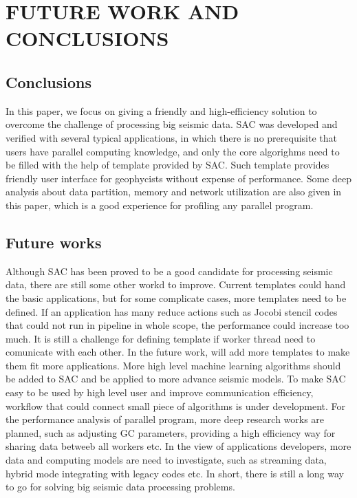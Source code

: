 %
%
%



\chapter{\uppercase{Future Work and Conclusions}}

\section{Conclusions}

In this paper, we focus on giving a friendly and high-efficiency solution to overcome the challenge of processing big seismic data. SAC was developed and verified with several typical applications, in which there is no prerequisite that users have parallel computing knowledge, and only the core algorighms need to be filled with the help of template provided by SAC. Such template provides friendly user interface for geophycists without expense of performance. Some deep analysis about data partition, memory and network utilization are also given in this paper, which is a good experience for profiling any parallel program. 

\section{Future works}

Although SAC has been proved to be a good candidate for processing seismic data, there are still some other workd to improve. Current templates could hand the basic applications, but for some complicate cases, more templates need to be defined. If an application has many reduce actions such as Jocobi stencil codes that could not run in pipeline in whole scope, the performance could increase too much. It is still a challenge for defining template if worker thread need to comunicate with each other. In the future work, will add more templates to make them fit more applications. More high level machine learning algorithms should be added to SAC and be applied to more advance seismic models. To make SAC easy to be used by high level user and improve communication efficiency, workflow that could connect small piece of algorithms is under development. For the performance analysis of parallel program, more deep research works are planned, such as adjusting GC parameters, providing a high efficiency way for sharing data betweeb all workers etc. In the view of applications developers, more data and computing models are need to investigate, such as streaming data, hybrid mode integrating with legacy codes etc. In short, there is still a long way to go for solving big seismic data processing problems.   

